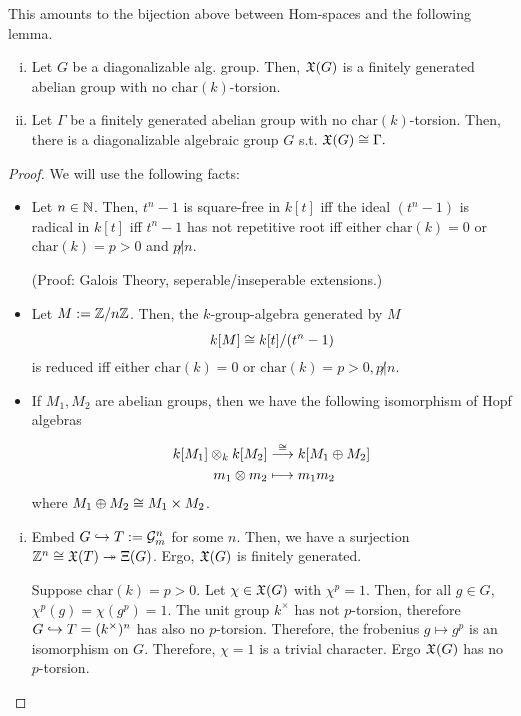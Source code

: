 This amounts to the bijection above between Hom-spaces and the following lemma.
\begin{lemma}
	\begin{enumerate}[(i)]
		\item Let $G$ be a diagonalizable alg. group. Then, $\mathfrak{X}(G)$ is a finitely generated abelian group with no $\mathrm{char}(k)$-torsion.
		\item Let $\Gamma$ be a finitely generated abelian group with no $\mathrm{char}(k)$-torsion. Then, there is a diagonalizable algebraic group $G$ s.t. $\mathfrak{X}(G) \overset{}{\cong} \Gamma.$
	\end{enumerate}
\end{lemma}
\newcommand{\chr}{\mathrm{char}}
\begin{proof}
We will use the following facts:
\begin{itemize}
	\item Let $n \in \mathbb{N}$. Then, 
	$t^n - 1$ is square-free in $k[t]$ iff the ideal $(t^n - 1)$ is radical in $k[t]$ iff $t^n -1$ has not repetitive root iff either $\chr(k) = 0$ or $\chr(k) = p > 0$ and $p\not | n$.
	
	(Proof: Galois Theory, seperable/inseperable extensions.)
	
	\item Let $M:= \mathbb{Z}/n\mathbb{Z}$. Then, the $k$-group-algebra generated by $M$ 
	\[k[M] \overset{}{\cong} k[t] / (t^n - 1)\]
	is reduced iff either $\chr(k) = 0$ or $\chr(k) = p > 0, p\not| n$.
	
	\item If $M_1, M_2$ are abelian groups, then we have the following isomorphism of Hopf algebras
	\begin{align*}
	k[M_1] \otimes_k k[M_2] &\overset{\overset{}{\cong}}{\longrightarrow} k[M_1 \oplus M_2]\\
	m_1 \otimes m_2 & \longmapsto m_1m_2
	\end{align*}
	where $M_1 \oplus M_2 \overset{}{\cong} M_1 \times M_2$.
\end{itemize}
\begin{enumerate}[(i)]
	\item Embed $G \overset{}{\hookrightarrow} T := \mathcal{G}^n_m$ for some $n$. Then, we have a surjection $\mathbb{Z}^n\overset{}{\cong} \mathfrak{X}(T)  \overset{}{\twoheadrightarrow} \Xi(G)$. Ergo, $\mathfrak{X}(G)$ is finitely generated.
	
	Suppose $\chr(k) = p > 0$. Let $\chi \in \mathfrak{X}(G)$ with $\chi^p = 1$. Then, for all $g \in G$, $\chi^p(g) = \chi(g^p) = 1$. The unit group $k^\times$ has not $p$-torsion, therefore $G \overset{}{\hookrightarrow} T = (k^\times)^n$ has also no $p$-torsion. Therefore, the frobenius $g \mapsto g^p$ is an isomorphism on $G$. Therefore, $\chi = 1$ is a trivial character. Ergo $\mathfrak{X}(G)$ has no $p$-torsion.
	

\end{enumerate}
\end{proof}
